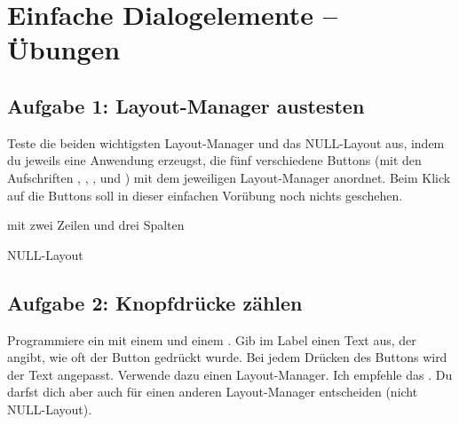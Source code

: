 \clearpage

\rehead[]{\textcolor{lightblue}{AvHG, Inf, My}}
\lohead[]{\textcolor{lightblue}{AvHG, Inf, My}}

\section{Einfache Dialogelemente -- Übungen}

\subsection{Aufgabe 1: Layout-Manager austesten}

Teste die beiden wichtigsten Layout-Manager und das NULL-Layout aus, indem du
jeweils eine Anwendung erzeugst, die fünf verschiedene Buttons (mit den
Aufschriften , , ,
 und ) mit dem jeweiligen Layout-Manager
anordnet. Beim Klick auf die Buttons soll in dieser einfachen Vorübung noch
nichts geschehen.

\begin{compactenum}[a)]
\item {}
\item {} mit zwei Zeilen und drei Spalten
\item NULL-Layout
\end{compactenum}


\subsection{Aufgabe 2: Knopfdrücke zählen}

Programmiere ein  mit einem  und einem
. Gib im Label einen Text aus, der angibt, wie oft der Button
gedrückt wurde. Bei jedem Drücken des Buttons wird der Text angepasst. Verwende
dazu einen Layout-Manager. Ich empfehle das . Du darfst dich
aber auch für einen anderen Layout-Manager entscheiden (nicht NULL-Layout).

